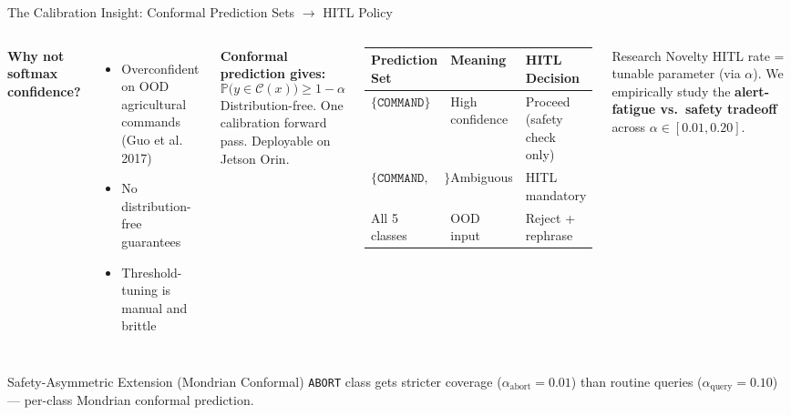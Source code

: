 \documentclass[aspectratio=169,10pt]{beamer}
\begin{document}
\begin{frame}{The Calibration Insight: Conformal Prediction Sets $\to$ HITL Policy}

\begin{columns}[T]
\textbf{Why not softmax confidence?}
\begin{itemize}\small
  \item Overconfident on OOD agricultural commands (Guo et al. 2017)
  \item No distribution-free guarantees
  \item Threshold-tuning is manual and brittle
\end{itemize}

\medskip
\textbf{Conformal prediction gives:}
\[
  \mathbb{P}\!\bigl(y \in \mathcal{C}(x)\bigr) \geq 1 - \alpha
\]
Distribution-free. One calibration forward pass. Deployable on Jetson Orin.

\begin{center}
\small
\begin{tabular}{@{}p{3.0cm}lp{2.6cm}@{}}
\toprule
\textbf{Prediction Set} & \textbf{Meaning} & \textbf{HITL Decision} \\
\midrule
$\{\texttt{COMMAND}\}$ & High confidence & Proceed (safety check only) \\
$\{\texttt{COMMAND, ABORT}\}$ & Ambiguous & HITL mandatory \\
All 5 classes & OOD input & Reject + rephrase \\
\bottomrule
\end{tabular}
\end{center}

\medskip
\begin{exampleblock}{Research Novelty}
\small
HITL rate = tunable parameter (via $\alpha$). We empirically study the
\textbf{alert-fatigue vs.\ safety tradeoff} across $\alpha \in [0.01, 0.20]$.
\end{exampleblock}
\end{columns}

\medskip
\begin{alertblock}{Safety-Asymmetric Extension (Mondrian Conformal)}
\small
\texttt{ABORT} class gets stricter coverage ($\alpha_{\text{abort}} = 0.01$) than routine queries
($\alpha_{\text{query}} = 0.10$) --- per-class Mondrian conformal prediction.
\end{alertblock}

\end{frame}
\end{document}
